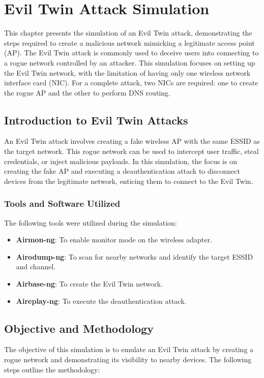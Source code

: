 \chapter{Evil Twin Attack Simulation}

This chapter presents the simulation of an Evil Twin attack, demonstrating the steps required to create a malicious network mimicking a legitimate access point (AP). The Evil Twin attack is commonly used to deceive users into connecting to a rogue network controlled by an attacker. This simulation focuses on setting up the Evil Twin network, with the limitation of having only one wireless network interface card (NIC). For a complete attack, two NICs are required: one to create the rogue AP and the other to perform DNS routing.

\section{Introduction to Evil Twin Attacks}
An Evil Twin attack involves creating a fake wireless AP with the same ESSID as the target network. This rogue network can be used to intercept user traffic, steal credentials, or inject malicious payloads. In this simulation, the focus is on creating the fake AP and executing a deauthentication attack to disconnect devices from the legitimate network, enticing them to connect to the Evil Twin.

\subsection{Tools and Software Utilized}
The following tools were utilized during the simulation:

\begin{itemize}
    \item \textbf{Airmon-ng}: To enable monitor mode on the wireless adapter.
    \item \textbf{Airodump-ng}: To scan for nearby networks and identify the target ESSID and channel.
    \item \textbf{Airbase-ng}: To create the Evil Twin network.
    \item \textbf{Aireplay-ng}: To execute the deauthentication attack.
\end{itemize}

\section{Objective and Methodology}
The objective of this simulation is to emulate an Evil Twin attack by creating a rogue network and demonstrating its visibility to nearby devices. The following steps outline the methodology:

